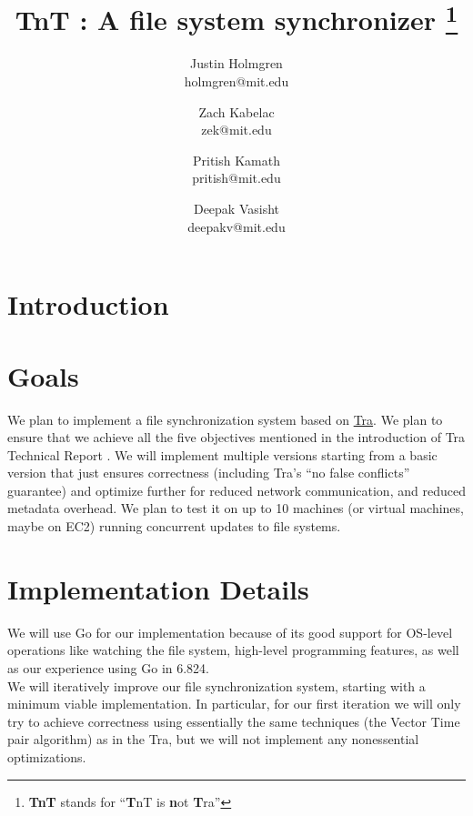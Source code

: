 



\title{TnT : A file system synchronizer \footnote{{\bf TnT} stands for ``{\bf T}nT is {\bf n}ot {\bf T}ra''}}
\author{
Justin Holmgren \\ \normalsize holmgren@mit.edu \and
Zach Kabelac \\ \normalsize zek@mit.edu \and
Pritish Kamath \\ \normalsize pritish@mit.edu\and
Deepak Vasisht \\ \normalsize deepakv@mit.edu
}

\maketitle


\section {Introduction}

\section{Goals}
We plan to implement a file synchronization system based on \href{http://swtch.com/tra/}{Tra}. We plan to ensure that we achieve all the five objectives mentioned in the introduction of Tra Technical Report \cite{tra-tech-report}. We will implement multiple versions starting from a basic version that just ensures correctness (including Tra's ``no false conflicts'' guarantee) and optimize further for reduced network communication, and reduced metadata overhead. We plan to test it on up to 10 machines (or virtual machines, maybe on EC2) running concurrent updates to file systems.

\section{Implementation Details}
We will use Go for our implementation because of its good support for OS-level operations like watching the file system, high-level programming features, as well as our experience using Go in 6.824.\\

\noindent We will iteratively improve our file synchronization system, starting with a minimum viable implementation.  In particular, for our first iteration we will only try to achieve correctness using essentially the same techniques (the Vector Time pair algorithm) as in the Tra, but we will not implement any nonessential optimizations.\\

